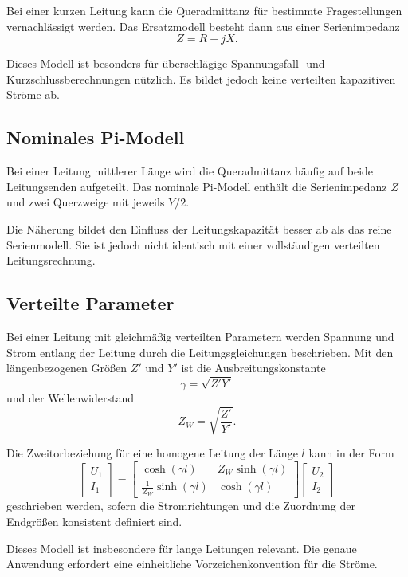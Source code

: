 Bei einer kurzen Leitung kann die Queradmittanz für bestimmte Fragestellungen
vernachlässigt werden. Das Ersatzmodell besteht dann aus einer Serienimpedanz
\[
  Z=R+jX.
\]

Dieses Modell ist besonders für überschlägige Spannungsfall- und
Kurzschlussberechnungen nützlich. Es bildet jedoch keine verteilten
kapazitiven Ströme ab.

\subsection{Nominales Pi-Modell}

Bei einer Leitung mittlerer Länge wird die Queradmittanz häufig auf beide
Leitungsenden aufgeteilt. Das nominale Pi-Modell enthält die Serienimpedanz
\(Z\) und zwei Querzweige mit jeweils \(Y/2\).

Die Näherung bildet den Einfluss der Leitungskapazität besser ab als das
reine Serienmodell. Sie ist jedoch nicht identisch mit einer vollständigen
verteilten Leitungsrechnung.

\subsection{Verteilte Parameter}

Bei einer Leitung mit gleichmäßig verteilten Parametern werden Spannung
und Strom entlang der Leitung durch die Leitungsgleichungen beschrieben.
Mit den längenbezogenen Größen \(Z'\) und \(Y'\) ist die Ausbreitungskonstante
\[
  \gamma=\sqrt{Z'Y'}
\]
und der Wellenwiderstand
\[
  Z_W=\sqrt{\frac{Z'}{Y'}}.
\]

Die Zweitorbeziehung für eine homogene Leitung der Länge \(l\) kann in der Form
\[
  \begin{bmatrix}
    U_1\\ I_1
  \end{bmatrix}
  =
  \begin{bmatrix}
    \cosh(\gamma l) & Z_W\sinh(\gamma l)\\
    \frac{1}{Z_W}\sinh(\gamma l) & \cosh(\gamma l)
  \end{bmatrix}
  \begin{bmatrix}
    U_2\\ I_2
  \end{bmatrix}
\]
geschrieben werden, sofern die Stromrichtungen und die Zuordnung der
Endgrößen konsistent definiert sind.

Dieses Modell ist insbesondere für lange Leitungen relevant. Die genaue
Anwendung erfordert eine einheitliche Vorzeichenkonvention für die Ströme.


